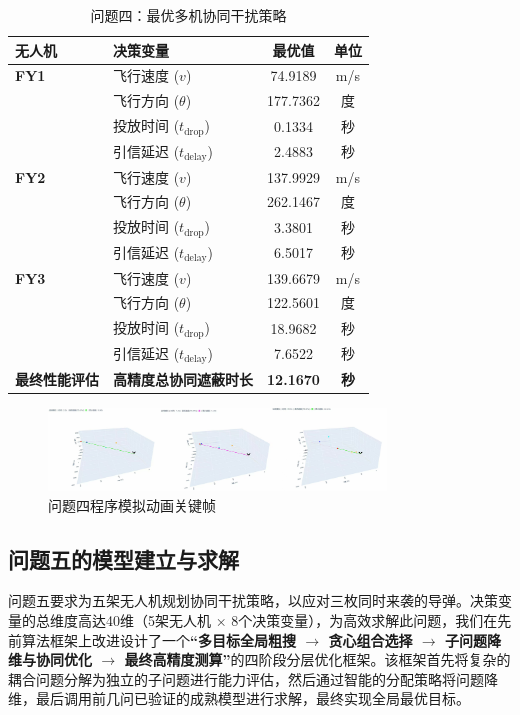 \documentclass[12pt]{article}
\begin{document}
\begin{CJK}{UTF8}{gbsn}
		\begin{table}[H]
			\centering
			\caption{问题四：最优多机协同干扰策略}
			\label{tab:q4_results}
				\begin{tabular}{@{}llcc@{}}
					\toprule
					\textbf{无人机} & \textbf{决策变量} & \textbf{最优值} & \textbf{单位} \\
					\midrule
					\textbf{FY1} & 飞行速度 ($v$) & 74.9189  & m/s \\
					& 飞行方向 ($\theta$) & 177.7362 & 度 \\
					& 投放时间 ($t_{\text{drop}}$) & 0.1334  & 秒 \\
					& 引信延迟 ($t_{\text{delay}}$) & 2.4883  & 秒 \\
					\midrule
					\textbf{FY2} & 飞行速度 ($v$) & 137.9929  & m/s \\
					& 飞行方向 ($\theta$) & 262.1467  & 度 \\
					& 投放时间 ($t_{\text{drop}}$) & 3.3801  & 秒 \\
					& 引信延迟 ($t_{\text{delay}}$) & 6.5017  & 秒 \\
					\midrule
					\textbf{FY3} & 飞行速度 ($v$) & 139.6679  & m/s \\
					& 飞行方向 ($\theta$) & 122.5601 & 度 \\
					& 投放时间 ($t_{\text{drop}}$) & 18.9682  & 秒 \\
					& 引信延迟 ($t_{\text{delay}}$) & 7.6522  & 秒 \\
					\midrule
					\textbf{最终性能评估} & \textbf{高精度总协同遮蔽时长} & \textbf{12.1670} & \textbf{秒} \\
					\bottomrule
			\end{tabular}
		\end{table}
		
		\begin{figure}[H]
			\centering
			\includegraphics[width=0.8\textwidth]{pic/sim4.jpg}
			\caption{问题四程序模拟动画关键帧}
			\label{fig:simulation_q4}
		\end{figure}
		
		\subsection{问题五的模型建立与求解}
		问题五要求为五架无人机规划协同干扰策略，以应对三枚同时来袭的导弹。决策变量的总维度高达40维（5架无人机 × 8个决策变量），为高效求解此问题，我们在先前算法框架上改进设计了一个\textbf{“多目标全局粗搜 $\rightarrow$ 贪心组合选择 $\rightarrow$ 子问题降维与协同优化 $\rightarrow$ 最终高精度测算”}的四阶段分层优化框架。该框架首先将复杂的耦合问题分解为独立的子问题进行能力评估，然后通过智能的分配策略将问题降维，最后调用前几问已验证的成熟模型进行求解，最终实现全局最优目标。
		

\end{CJK}
\end{document}
